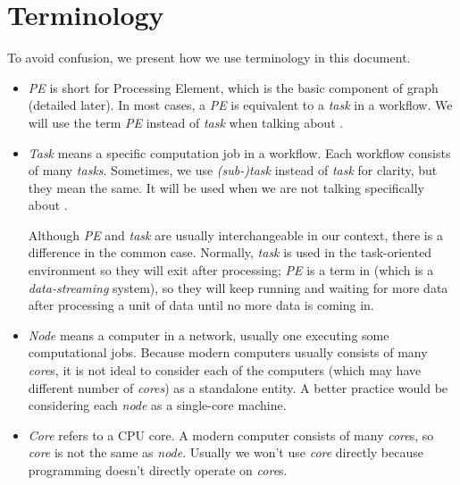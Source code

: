 \chapter{Terminology}
To avoid confusion, we present how we use terminology in this document.

\newenvironment{term_box}{\begin{tcolorbox}[enhanced,width=5in,size=fbox,
    fontupper=\large\bfseries,drop shadow southwest,sharp corners]}{
\end{tcolorbox}}

\begin{itemize}

\item \emph{PE} is short for Processing Element, which is the basic component of \dpy graph (detailed later). In most cases, a \emph{PE} is equivalent to a \emph{task} in a workflow. We will use the term \emph{PE} instead of \emph{task} when talking about \dpy.

\item \emph{Task} means a specific computation job in a workflow. Each workflow consists of many \emph{tasks}. Sometimes, we use \emph{(sub-)task} instead of \emph{task} for clarity, but they mean the same. It will be used when we are not talking specifically about \dpy.

\begin{term_box}
Although \emph{PE} and \emph{task} are usually interchangeable in our context, there is a difference in the common case. Normally, \emph{task} is used in the task-oriented environment so they will exit after processing; \emph{PE} is a term in \dpy (which is a \emph{data-streaming} system), so they will keep running and waiting for more data after processing a unit of data until no more data is coming in.
\end{term_box}	
	
\item \emph{Node} means a computer in a network, usually one executing some computational jobs. Because modern computers usually consists of many \emph{core}s, it is not ideal to consider each of the computers (which may have different number of \emph{cores}) as a standalone entity. A better practice would be considering each \emph{node} as a single-core machine.

\item \emph{Core} refers to a CPU core. A modern computer consists of many \emph{core}s, so \emph{core} is not the same as \emph{node}. Usually we won't use \emph{core} directly because programming doesn't directly operate on \emph{core}s.


\end{itemize}
